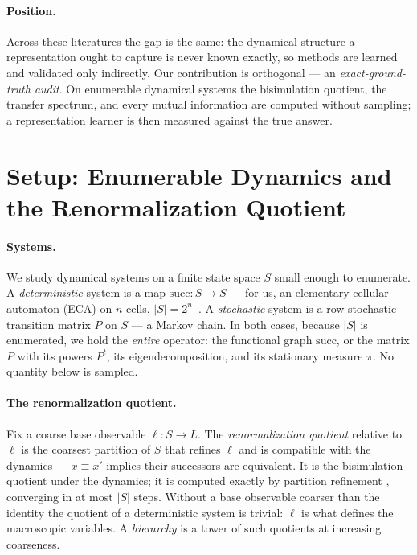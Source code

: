 \documentclass[11pt]{article}
\newcommand{\succf}{\mathrm{succ}}
\begin{document}
\paragraph{Position.}
Across these literatures the gap is the same: the dynamical structure a
representation ought to capture is never known exactly, so methods are learned
and validated only indirectly. Our contribution is orthogonal --- an
\emph{exact-ground-truth audit}. On enumerable dynamical systems the
bisimulation quotient, the transfer spectrum, and every mutual information are
computed without sampling; a representation learner is then measured against the
true answer.

\section{Setup: Enumerable Dynamics and the Renormalization Quotient}
\label{sec:setup}

\paragraph{Systems.}
We study dynamical systems on a finite state space $S$ small enough to
enumerate. A \emph{deterministic} system is a map $\succf : S \to S$ --- for
us, an elementary cellular automaton (ECA) on $n$ cells, $|S| = 2^n$~\citep{wuensche1999z}. A
\emph{stochastic} system is a row-stochastic transition matrix $P$ on $S$ ---
a Markov chain. In both cases, because $|S|$ is enumerated, we hold the
\emph{entire} operator: the functional graph $\succf$, or the matrix $P$ with
its powers $P^t$, its eigendecomposition, and its stationary measure $\pi$. No
quantity below is sampled.

\paragraph{The renormalization quotient.}
Fix a coarse base observable $\ell : S \to L$. The \emph{renormalization
quotient} relative to $\ell$ is the coarsest partition of $S$ that refines
$\ell$ and is compatible with the dynamics --- $x \equiv x'$ implies their
successors are equivalent. It is the bisimulation quotient under the dynamics;
it is computed exactly by partition refinement \citep{paigetarjan1987},
converging in at most $|S|$ steps. Without a base observable coarser than the
identity the quotient of a deterministic system is trivial: $\ell$ is what
defines the macroscopic variables. A \emph{hierarchy} is a tower of such
quotients at increasing coarseness.
\end{document}

